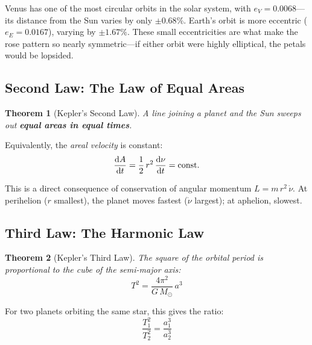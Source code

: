 \documentclass[11pt,letterpaper]{article}
\theoremstyle{definition}
\theoremstyle{plain}
\newtheorem{theorem}{Theorem}[section]
\theoremstyle{remark}
\begin{document}
\begin{physicsintuition}
Venus has one of the most circular orbits in the solar system,
with $e_V = 0.0068$—its distance from the Sun varies by only
$\pm 0.68\%$. Earth's orbit is more eccentric ($e_E = 0.0167$),
varying by $\pm 1.67\%$. These small eccentricities are what
make the rose pattern so nearly symmetric—if either orbit were
highly elliptical, the petals would be lopsided.
\end{physicsintuition}


\subsection{Second Law: The Law of Equal Areas}

\begin{theorem}[Kepler's Second Law]
A line joining a planet and the Sun sweeps out \textbf{equal areas
in equal times}.
\end{theorem}

Equivalently, the \textit{areal velocity} is constant:
\begin{equation}
  \dv{A}{t} = \frac{1}{2}\,r^2\,\dv{\nu}{t} = \text{const.}
  \label{eq:areal}
\end{equation}

This is a direct consequence of conservation of angular momentum
$L = m\,r^2\,\dot{\nu}$. At perihelion ($r$ smallest), the planet
moves fastest ($\dot{\nu}$ largest); at aphelion, slowest.


\subsection{Third Law: The Harmonic Law}

\begin{theorem}[Kepler's Third Law]
The square of the orbital period is proportional to the cube of the
semi-major axis:
\begin{equation}
  T^2 = \frac{4\pi^2}{G\,M_\odot}\,a^3
  \label{eq:kepler3}
\end{equation}
\end{theorem}

For two planets orbiting the same star, this gives the ratio:
\begin{equation}
  \frac{T_1^2}{T_2^2} = \frac{a_1^3}{a_2^3}
  \label{eq:kepler3ratio}
\end{equation}
\end{document}
